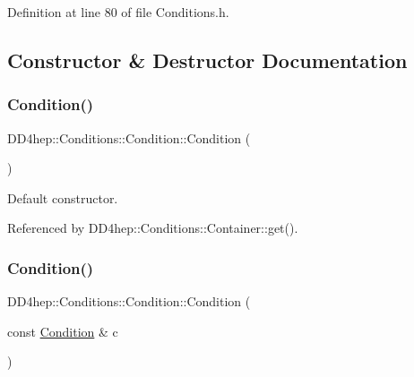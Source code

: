 Definition at line 80 of file Conditions.\+h.



\subsection{Constructor \& Destructor Documentation}
\hypertarget{class_d_d4hep_1_1_conditions_1_1_condition_a3d58e61c7c8a890d2b9d8e0fbd531937}{}\label{class_d_d4hep_1_1_conditions_1_1_condition_a3d58e61c7c8a890d2b9d8e0fbd531937} 
\subsubsection{\texorpdfstring{Condition()}{Condition()}\hspace{0.1cm}{\footnotesize\ttfamily [1/5]}}
{\footnotesize\ttfamily D\+D4hep\+::\+Conditions\+::\+Condition\+::\+Condition (\begin{DoxyParamCaption}{ }\end{DoxyParamCaption})\hspace{0.3cm}{\ttfamily [default]}}



Default constructor. 



Referenced by D\+D4hep\+::\+Conditions\+::\+Container\+::get().

\hypertarget{class_d_d4hep_1_1_conditions_1_1_condition_a56a1f2ad3a8848b0b2453993b5492fd9}{}\label{class_d_d4hep_1_1_conditions_1_1_condition_a56a1f2ad3a8848b0b2453993b5492fd9} 
\subsubsection{\texorpdfstring{Condition()}{Condition()}\hspace{0.1cm}{\footnotesize\ttfamily [2/5]}}
{\footnotesize\ttfamily D\+D4hep\+::\+Conditions\+::\+Condition\+::\+Condition (\begin{DoxyParamCaption}\item[{const \hyperlink{class_d_d4hep_1_1_conditions_1_1_condition}{Condition} \&}]{c }\end{DoxyParamCaption})\hspace{0.3cm}{\ttfamily [default]}}



